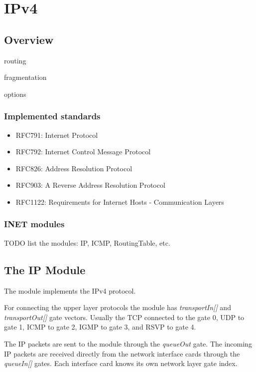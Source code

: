 \chapter{IPv4}
\label{cha:ipv4}


\section{Overview}

routing

fragmentation

options

\subsection{Implemented standards}

\begin{itemize}
  \item RFC791: Internet Protocol
  \item RFC792: Internet Control Message Protocol
  \item RFC826: Address Resolution Protocol
  \item RFC903: A Reverse Address Resolution Protocol
  \item RFC1122: Requirements for Internet Hosts - Communication Layers
\end{itemize}


\subsection{INET modules}

TODO list the modules: IP, ICMP, RoutingTable, etc.

\section{The IP Module}

The  module implements the IPv4 protocol.

For connecting the upper layer protocols the  module
has \emph{transportIn[]} and \emph{transportOut[]} gate vectors.
Usually the TCP connected to the gate 0, UDP to gate 1, ICMP to
gate 2, IGMP to gate 3, and RSVP to gate 4.

The IP packets are sent to the  module through the
\emph{queueOut} gate. The incoming IP packets are received
directly from the network interface cards through the
\emph{queueIn[]} gates. Each interface card knows its own
network layer gate index.

